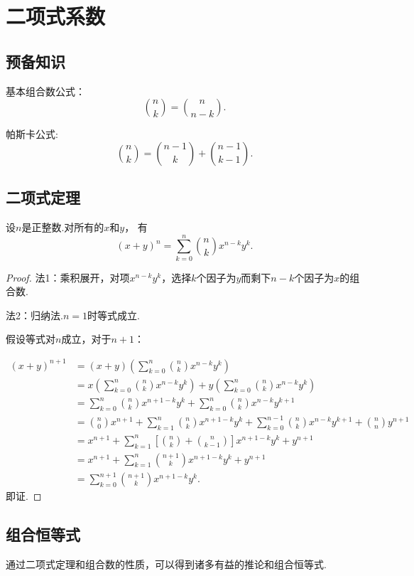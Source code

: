 \chapter{二项式系数}
\section*{预备知识}
基本组合数公式：
\[\binom{n}{k} = \binom{n}{n-k}.\]

帕斯卡公式:
\[\binom{n}{k} = \binom{n-1}{k}+\binom{n-1}{k-1}.\]

\section{二项式定理}
\begin{theorem}[二项式定理]
    设\(n\)是正整数.对所有的\(x\)和\(y\)， 有\[(x + y)^n = \sum_{k=0}^{n} \binom{n}{k} x^{n-k} y^k.\]
\end{theorem}
\begin{proof}
    法1：乘积展开，对项\(x^{n-k}y^k\)，选择\(k\)个因子为\(y\)而剩下\(n-k\)个因子为\(x\)的组合数.

    法2：归纳法.\(n=1\)时等式成立.

    假设等式对\(n\)成立，对于\(n+1\)：

    \begin{align*}
(x + y)^{n+1} &= (x + y) \left( \sum_{k=0}^{n} \binom{n}{k} x^{n-k} y^k \right) \\
&= x \left( \sum_{k=0}^{n} \binom{n}{k} x^{n-k} y^k \right) + y \left( \sum_{k=0}^{n} \binom{n}{k} x^{n-k} y^k \right) \\
&= \sum_{k=0}^{n} \binom{n}{k} x^{n+1-k} y^k + \sum_{k=0}^{n} \binom{n}{k} x^{n-k} y^{k+1} \\
&= \binom{n}{0} x^{n+1} + \sum_{k=1}^{n} \binom{n}{k} x^{n+1-k} y^k + \sum_{k=0}^{n-1} \binom{n}{k} x^{n-k} y^{k+1} + \binom{n}{n} y^{n+1}\\
&= x^{n+1} + \sum_{k=1}^{n} \left[ \binom{n}{k} + \binom{n}{k-1} \right] x^{n+1-k} y^k + y^{n+1}\\
&=x^{n+1} + \sum_{k=1}^{n} \binom{n+1}{k} x^{n+1-k} y^k + y^{n+1}\\
&=\sum_{k=0}^{n+1} \binom{n+1}{k} x^{n+1-k} y^k.
    \end{align*}
    即证.
\end{proof} 
\section{组合恒等式}
通过二项式定理和组合数的性质，可以得到诸多有益的推论和组合恒等式.

